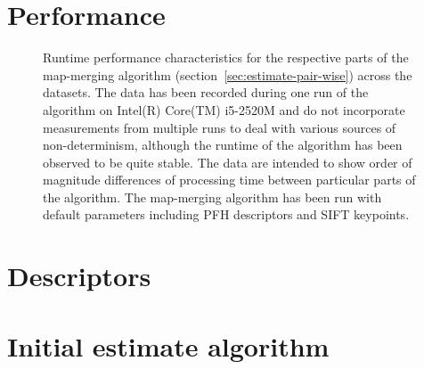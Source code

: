 \section{Performance}

\begin{figure}
  \centering
  
  \caption{Runtime performance characteristics for the respective parts of the map-merging algorithm (section~\ref{sec:estimate-pair-wise}) across the datasets. The data has been recorded during one run of the algorithm on Intel(R) Core(TM) i5-2520M and do not incorporate measurements from multiple runs to deal with various sources of non-determinism, although the runtime of the algorithm has been observed to be quite stable. The data are intended to show order of magnitude differences of processing time between particular parts of the algorithm. The map-merging algorithm has been run with default parameters including \gls{PFH} descriptors and \gls{SIFT} keypoints.}
  \label{fig:plot:perf}
\end{figure}

\section{Descriptors}

\section{Initial estimate algorithm}

